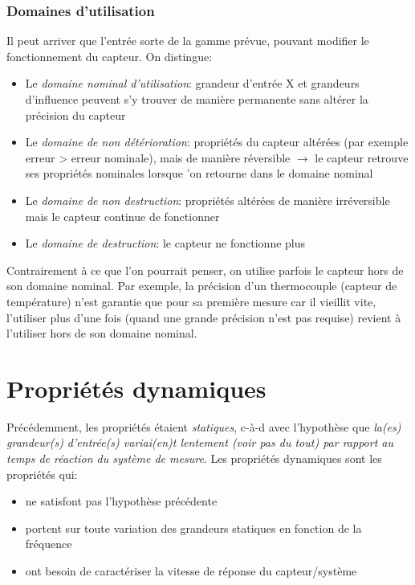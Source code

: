 \subsubsection{Domaines d'utilisation}
Il peut arriver que l'entrée sorte de la gamme prévue, pouvant modifier le fonctionnement du capteur. On distingue:
\begin{itemize}
	\item Le \emph{domaine nominal d'utilisation}: grandeur d'entrée X et grandeurs d'influence peuvent s'y trouver de manière permanente sans altérer la précision du capteur
	\item Le \emph{domaine de non détérioration}: propriétés du capteur altérées (par exemple erreur > erreur nominale), mais de manière réversible \(\rightarrow\) le capteur retrouve ses propriétés nominales lorsque 'on retourne dans le domaine nominal 
	\item Le \emph{domaine de non destruction}: propriétés altérées de manière irréversible mais le capteur continue de fonctionner 
	\item Le \emph{domaine de destruction}: le capteur ne fonctionne plus
\end{itemize}
Contrairement à ce que l'on pourrait penser, on utilise parfois le capteur hors de son domaine nominal. Par exemple, la précision d'un thermocouple (capteur de température) n'est garantie que pour sa première mesure car il vieillit vite, l'utiliser plus d'une fois (quand une grande précision n'est pas requise) revient à l'utiliser hors de son domaine nominal.

\section{Propriétés dynamiques}
Précédemment, les propriétés étaient \emph{statiques}, c-à-d avec l'hypothèse que \emph{la(es) grandeur(s) d'entrée(s) variai(en)t lentement (voir pas du tout) par rapport au temps de réaction du système de mesure}. Les propriétés dynamiques sont les propriétés qui:
\begin{itemize}
	\item ne satisfont pas l'hypothèse précédente
	\item portent sur toute variation des grandeurs statiques en fonction de la fréquence
	\item ont besoin de caractériser la vitesse de réponse du capteur/système
\end{itemize}
